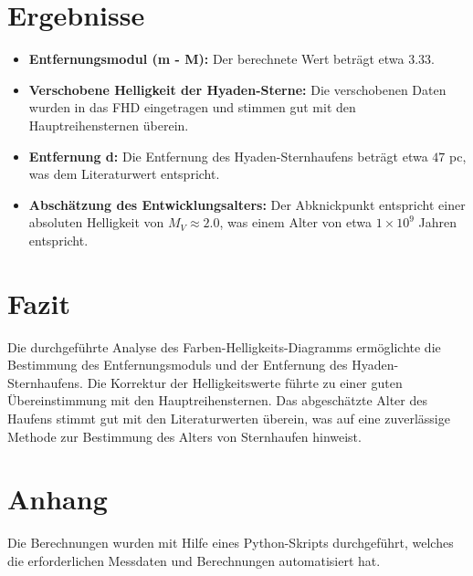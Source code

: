 \documentclass[a4paper,12pt]{article}
\begin{document}
\section*{Ergebnisse}

\begin{itemize}
    \item \textbf{Entfernungsmodul (m - M):} Der berechnete Wert beträgt etwa \( 3.33 \).
    \item \textbf{Verschobene Helligkeit der Hyaden-Sterne:} Die verschobenen Daten wurden in das FHD eingetragen und stimmen gut mit den Hauptreihensternen überein.
    \item \textbf{Entfernung d:} Die Entfernung des Hyaden-Sternhaufens beträgt etwa \( 47 \) pc, was dem Literaturwert entspricht.
    \item \textbf{Abschätzung des Entwicklungsalters:} Der Abknickpunkt entspricht einer absoluten Helligkeit von \( M_V \approx 2.0 \), was einem Alter von etwa \( 1 \times 10^9 \) Jahren entspricht.
\end{itemize}

\section*{Fazit}
Die durchgeführte Analyse des Farben-Helligkeits-Diagramms ermöglichte die Bestimmung des Entfernungsmoduls und der Entfernung des Hyaden-Sternhaufens. Die Korrektur der Helligkeitswerte führte zu einer guten Übereinstimmung mit den Hauptreihensternen. Das abgeschätzte Alter des Haufens stimmt gut mit den Literaturwerten überein, was auf eine zuverlässige Methode zur Bestimmung des Alters von Sternhaufen hinweist.
\section*{Anhang}
Die Berechnungen wurden mit Hilfe eines Python-Skripts durchgeführt, welches die erforderlichen Messdaten und Berechnungen automatisiert hat.
\end{document}
